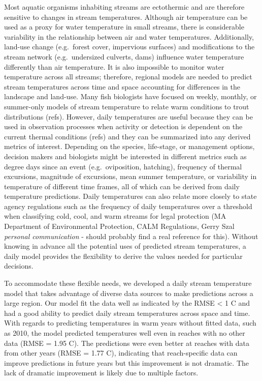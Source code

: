 Most aquatic organisms inhabiting streams are ectothermic and are
therefore sensitive to changes in stream temperatures. Although air
temperature can be used as a proxy for water temperature in small
streams, there is considerable variability in the relationship between
air and water temperatures. Additionally, land-use change (e.g.~forest
cover, impervious surfaces) and modifications to the stream network
(e.g.~undersized culverts, dams) influence water temperature differently
than air temperature. It is also impossible to monitor water temperature
across all streams; therefore, regional models are needed to predict
stream temperatures across time and space accounting for differences in
the landscape and land-use. Many fish biologists have focused on weekly,
monthly, or summer-only models of stream temperature to relate warm
conditions to trout distributions (refs). However, daily temperatures
are useful because they can be used in observation processes when
activity or detection is dependent on the current thermal conditions
(refs) and they can be summarized into any derived metrics of interest.
Depending on the species, life-stage, or management options, decision
makers and biologists might be interested in different metrics such as
degree days since an event (e.g.~oviposition, hatching), frequency of
thermal excursions, magnitude of excursions, mean summer temperature, or
variability in temperature of different time frames, all of which can be
derived from daily temperature predictions. Daily temperatures can also
relate more closely to state agency regulations such as the frequency of
daily temperatures over a threshold when classifying cold, cool, and
warm streams for legal protection (MA Department of Environmental
Protection, CALM Regulations, Gerry Szal \emph{personal communication} -
should probably find a real reference for this). Without knowing in
advance all the potential uses of predicted stream temperatures, a daily
model provides the flexibility to derive the values needed for
particular decisions.

To accommodate these flexible needs, we developed a daily stream
temperature model that takes advantage of diverse data sources to make
predictions across a large region. Our model fit the data well as
indicated by the RMSE \textless{} 1 C and had a good ability to predict
daily stream temperatures across space and time. With regards to
predicting temperatures in warm years without fitted data, such as 2010,
the model predicted temperatures well even in reaches with no other data
(RMSE = 1.95 C). The predictions were even better at reaches with data
from other years (RMSE = 1.77 C), indicating that reach-specific data
can improve predictions in future years but this improvement is not
dramatic. The lack of dramatic improvement is likely due to multiple
factors.

